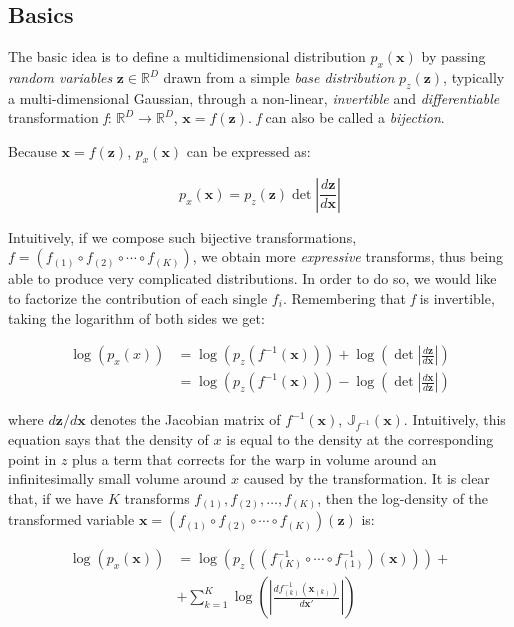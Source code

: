 \subsection{Basics}

The basic idea is to define a multidimensional distribution $p_x(\mathbf{x})$ by passing \emph{random variables} $\mathbf{z} \in \mathbb{R}^D$ drawn from a simple \emph{base distribution} $p_z(\mathbf{z})$, typically a multi-dimensional Gaussian, through a non-linear, \emph{invertible} and \emph{differentiable} transformation \emph{f}: $\mathbb{R}^D \rightarrow \mathbb{R}^D$, $\mathbf{x} = f(\mathbf{z})$. \emph{f} can also be called a \emph{bijection}.

Because $\mathbf{x} = f(\mathbf{z})$, $p_x(\mathbf{x})$ can be expressed as:

\[
p_x(\mathbf{x}) = p_z(\mathbf{z})\det\left|\frac{d\mathbf{z}}{d\mathbf{x}}\right|
\]

Intuitively, if we compose such bijective transformations,\\ $f = (f_{(1)}\circ f_{(2)}\circ\cdots\circ f_{(K)})$, we obtain more \emph{expressive} transforms, thus being able to produce very complicated distributions. In order to do so, we would like to factorize the contribution of each single $f_i$.
Remembering that \emph{f} is invertible, taking the logarithm of both sides we get:

\begin{equation}\label{eqn:logpdf}
	\begin{aligned}
		\log(p_x(x)) &= \log(p_z(f^{-1}(\mathbf{x})))+\log\left(\det\left|\frac{d\mathbf{z}}{d\mathbf{x}}\right|\right)\\
		&= \log(p_z(f^{-1}(\mathbf{x})))-\log\left(\det\left|\frac{d\mathbf{x}}{d\mathbf{z}}\right|\right)
	\end{aligned}
\end{equation}

where $d\mathbf{z}/d\mathbf{x}$ denotes the Jacobian matrix of $f^{-1}(\mathbf{x})$, $\mathbb{J}_{f^{-1}}(\mathbf{x})$.
Intuitively, this equation says that the density of $x$ is equal to the density at the corresponding point in $z$ plus a term that corrects for the warp in volume around an infinitesimally small volume around $x$ caused by the transformation.
 It is clear that, if we have $K$ transforms $f_{(1)}, f_{(2)},\ldots,f_{(K)}$, then the log-density of the transformed variable $\mathbf{x}=(f_{(1)}\circ f_{(2)}\circ\cdots\circ f_{(K)})(\mathbf{z})$ is:
	
	\begin{equation*}
		\begin{aligned}
			\log(p_x(\mathbf{x})) &= \log\left(p_z\left(\left(f_{(K)}^{-1}\circ\cdots\circ f_{(1)}^{-1}\right)\left(\mathbf{x}\right)\right)\right)+\\
			&+\sum^{K}_{k=1}\log\left(\left|\frac{df^{-1}_{(k)}(\mathbf{x}_{(k)})}{d\mathbf{x}'}\right|\right)
		\end{aligned}
	\end{equation*}
	
